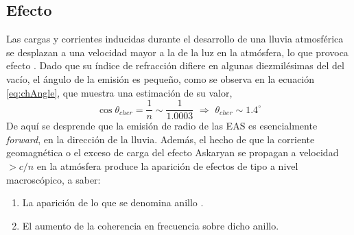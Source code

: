 \subsection{Efecto \cher{}}
\label{sbsc:cher_emision}
	
	Las cargas y corrientes inducidas durante el desarrollo de una lluvia atmosf\'erica se desplazan a una velocidad mayor a la de la luz en la atm\'osfera, lo que provoca efecto \cher{}.
	Dado que su \'indice de refracci\'on difiere en algunas diezmil\'esimas del del vac\'io, el \'angulo \cher{} de la emisi\'on es peque\~no, como se observa en la ecuación \ref{eq:chAngle}, que muestra una estimación de su valor,
	\begin{equation}
	\cos\theta_{cher} = \frac{1}{n} \sim \frac{1}{1.0003}
	\,\, \Rightarrow \,\,
	\theta_{cher} \sim 1.4^\circ
	\label{eq:chAngle}
	\end{equation}
	De aqu\'i se desprende que la emisi\'on \cher{} de radio de las EAS es esencialmente \emph{forward}, en la direcci\'on de la lluvia.
	Adem\'as, el hecho de que la corriente geomagn\'etica o el exceso de carga del efecto Askaryan se propagan a velocidad $>c/n$ en la atm\'osfera produce la aparici\'on de efectos de tipo \cher{} a nivel macrosc\'opico, a saber:
	\begin{enumerate}
	 \item La aparici\'on de lo que se denomina anillo \cher{}.
	 \item El aumento de la coherencia en frecuencia sobre dicho anillo.
	\end{enumerate}

	
